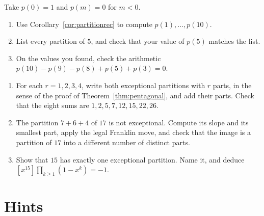 \begin{exercise}[$\star\star$]\label{ex:rw02b}
Take $p(0)=1$ and $p(m)=0$ for $m<0$.
\begin{enumerate}[label=(\alph*)]
\item Use Corollary~\ref{cor:partitionrec} to compute $p(1),\dots,p(10)$.
\item List every partition of $5$, and check that your value of $p(5)$ matches the list.
\item On the values you found, check the arithmetic $p(10)-p(9)-p(8)+p(5)+p(3)=0$.
\end{enumerate}
\end{exercise}

\begin{exercise}[$\star\star\star$]\label{ex:rw02c}
\begin{enumerate}[label=(\alph*)]
\item For each $r=1,2,3,4$, write both exceptional partitions with $r$ parts, in the sense of the proof of Theorem~\ref{thm:pentagonal}, and add their parts. Check that the eight sums are $1,2,5,7,12,15,22,26$.
\item The partition $7+6+4$ of $17$ is not exceptional. Compute its slope and its smallest part, apply the legal Franklin move, and check that the image is a partition of $17$ into a different number of distinct parts.
\item Show that $15$ has exactly one exceptional partition. Name it, and deduce $[x^{15}]\prod_{k\ge1}(1-x^k)=-1$.
\end{enumerate}
\end{exercise}

\section{Hints}

